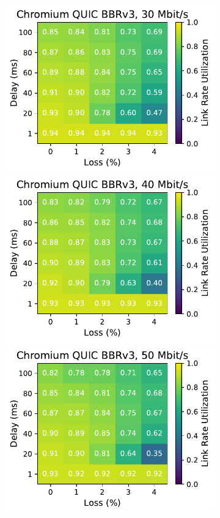 \begin{figure}[ht]
\begin{subfigure}[b]{0.22\linewidth}
        \includegraphics[width=\linewidth,trim={0 0 2cm 0},clip]{figures/heatmaps/heatmap_quic_bbr3_30mbps.pdf}
        \includegraphics[width=\linewidth,trim={0 0 2cm 0},clip]{figures/heatmaps/heatmap_quic_bbr3_40mbps.pdf}
        \includegraphics[width=\linewidth,trim={0 0 2cm 0},clip]{figures/heatmaps/heatmap_quic_bbr3_50mbps.pdf}

\end{subfigure}
\end{figure}
